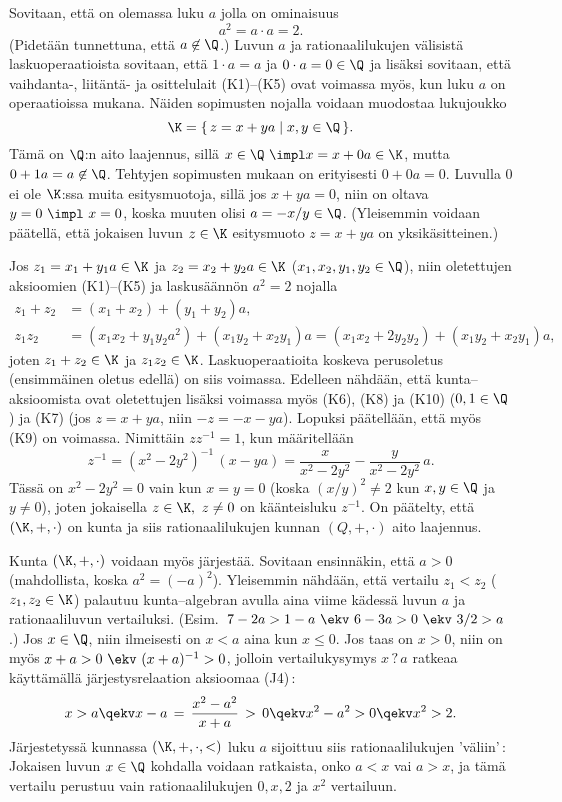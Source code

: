 \begin{Exa} \label{muuan kunta} Sovitaan, että on olemassa luku $a$ jolla on ominaisuus
\[
a^2 = a \cdot a = 2.
\]
(Pidetään tunnettuna, että $a\not\in\Q$.) Luvun $a$ ja rationaalilukujen välisistä
laskuoperaatioista sovitaan, että $1 \cdot a = a$ ja $0 \cdot a = 0\in\Q$ ja lisäksi
sovitaan, että vaihdanta-, liitäntä- ja osittelulait (K1)--(K5) ovat voimassa myös, kun
luku $a$ on operaatioissa mukana. Näiden sopimusten nojalla voidaan muodostaa lukujoukko
\[
\K = \{\, z = x + ya \mid x,y \in \Q\,\}.
\]
Tämä on $\Q$:n aito laajennus, sillä $x\in\Q\ \impl x=x+0a\in\K$, mutta $0+1a=a\not\in\Q$.
Tehtyjen sopimusten mukaan on erityisesti $0+0a=0$. Luvulla $0$ ei ole $\K$:ssa muita
esitysmuotoja, sillä jos $x+ya=0$, niin on oltava $y=0\ \impl\ x=0$, koska muuten olisi
$a=-x/y\in\Q$. (Yleisemmin voidaan päätellä, että jokaisen luvun $z\in\K$ esitysmuoto $z=x+ya$
on yksikäsitteinen.)

Jos $z_1 = x_1 + y_1a \in \K$ ja $z_2 = x_2 + y_2a \in \K$ ($x_1,x_2,y_1,y_2 \in \Q$), niin
oletettujen aksioomien (K1)--(K5) ja laskusäännön $a^2=2$ nojalla
\begin{align*}
z_1+z_2 &= (x_1+x_2) + (y_1+y_2)a, \\
z_1z_2  &= (x_1x_2 + y_1y_2a^2) + (x_1y_2 + x_2y_1)a = (x_1x_2+2y_2y_2) + (x_1y_2 + x_2y_1)a,
\end{align*}
joten $z_1+z_2\in\K$ ja $z_1z_2\in\K$. Laskuoperaatioita koskeva perusoletus (ensimmäinen
oletus edellä) on siis voimassa. Edelleen nähdään, että kunta--aksioomista ovat oletettujen
lisäksi voimassa myös (K6), (K8) ja (K10) ($0,1\in\Q$) ja (K7) (jos $z = x + ya$, niin 
$-z = -x -ya$). Lopuksi päätellään, että myös (K9) on voimassa. Nimittäin $z z^{-1} = 1$, kun
määritellään 
\[
z^{-1} = (x^2-2y^2)^{-1}\,(x-ya) = \dfrac{x}{x^2-2y^2} - \dfrac{y}{x^2-2y^2}\,a. 
\]
Tässä on $x^2-2y^2=0$ vain kun $x=y=0$ (koska $(x/y)^2 \neq 2$ kun $x,y\in\Q$ ja $y\neq 0$),
joten jokaisella $z\in\K,\ z \neq 0$ on käänteisluku $z^{-1}$. On päätelty, että $(\K,+,\cdot)$
on kunta ja siis rationaalilukujen kunnan $(Q,+,\cdot)$ aito laajennus.

Kunta $(\K,+,\cdot)$ voidaan myös järjestää. Sovitaan ensinnäkin, että $a>0$ (mahdollista,
koska $a^2=(-a)^2$). Yleisemmin nähdään, että vertailu $z_1<z_2$ ($z_1,z_2\in\K$) palautuu
kunta--algebran avulla aina viime kädessä luvun $a$ ja rationaaliluvun vertailuksi.
(Esim.\ $7-2a>1-a\ \ekv\ 6-3a>0\ \ekv\ 3/2>a$.) Jos $x\in\Q$, niin ilmeisesti on $x<a$ aina kun
$x \le 0$. Jos taas on $x>0$, niin on myös $x+a>0\ \ekv\ (x+a)^{-1}>0$, jolloin vertailukysymys
$x\,?\,a$ ratkeaa käyttämällä järjestysrelaation aksioomaa (J4)\,:
\[
x>a \qekv x-a\,=\,\frac{x^2-a^2}{x+a}\,>\,0 \qekv x^2-a^2>0 \qekv x^2>2.
\]   
Järjestetyssä kunnassa $(\K,+,\cdot,<)$ luku $a$ sijoittuu siis rationaalilukujen 'väliin'\,:
Jokaisen luvun $x \in \Q$ kohdalla voidaan ratkaista, onko $a<x$ vai $a>x$, ja tämä vertailu
perustuu vain rationaalilukujen $0,x,2$ ja $x^2$ vertailuun. \loppu
\end{Exa}

